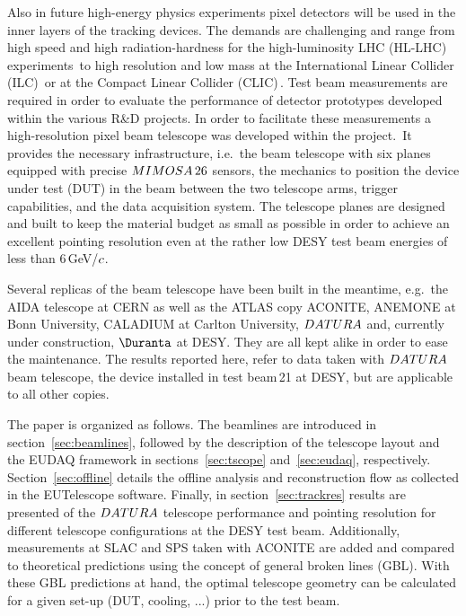 

Also in future high-energy physics experiments pixel detectors will be used in the inner layers of the tracking devices. 
The demands are challenging and range from high speed and high radiation-hardness for the high-luminosity LHC (HL-LHC)
 experiments\,\cite{Nurnberg:2014aya, Garcia-Argos:2015zda} to high resolution and low mass at the International Linear Collider (ILC)\,\cite{ILC} or at the Compact Linear Collider (CLIC)\,\cite{CLIC}. 
Test beam measurements are required in order to evaluate the performance of detector prototypes developed within the various R\&D projects. 
In order to facilitate these measurements a high-resolution pixel beam telescope was developed within the \eudet project.\,\cite{ref:eudetreport200902}
It provides the necessary infrastructure, i.e.~the beam telescope with six planes equipped with precise $MIMOSA\,26$ sensors,
 the mechanics to position the device under test (DUT) in the beam between the two telescope arms, trigger capabilities, and the \eudaq data acquisition system. 
The telescope planes are designed and built to keep the material budget as small as possible in order to achieve an excellent pointing resolution
 even at the rather low DESY test beam energies of less than 6\,GeV/$\mathnormal{c}$.

Several replicas of the beam telescope have been built in the meantime, e.g.~the AIDA telescope at CERN as well as the ATLAS copy ACONITE, ANEMONE at Bonn University, CALADIUM at Carlton University, 
 $DATURA$ and, currently under construction, $\Duranta$ at DESY. 
They are all kept alike in order to ease the maintenance. 
The results reported here, refer to data taken with $DATURA$ beam telescope, the device installed in test beam\,21 at DESY, but are applicable to all other copies. 

The paper is organized as follows. 
The beamlines are introduced in section~\ref{sec:beamlines}, followed by the description of the telescope layout and the EUDAQ framework in sections~\ref{sec:tscope} and~\ref{sec:eudaq}, respectively.
Section~\ref{sec:offline} details the offline analysis and reconstruction flow as collected in the EUTelescope software. 
Finally, in section~\ref{sec:trackres} results are presented of the $DATURA$ telescope performance and pointing resolution for different telescope configurations at the DESY test beam. 
Additionally, measurements at SLAC and SPS taken with ACONITE are added and compared to theoretical predictions using the concept of general broken lines (GBL).
With these GBL predictions at hand, the optimal telescope geometry can be calculated for a given set-up (DUT, cooling, ...) prior to the test beam.

